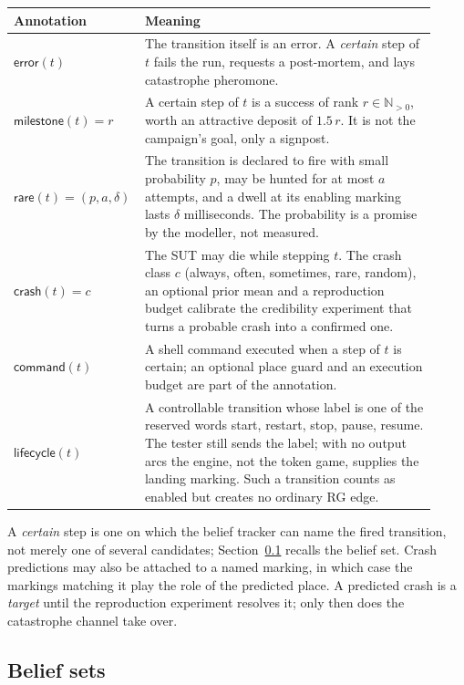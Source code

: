 \documentclass[11pt,a4paper]{article}
\newcommand{\Npos}{\mathbb{N}_{>0}}
\begin{document}
\begin{center}
\small
\begin{tabular}{@{}p{0.24\linewidth}p{0.68\linewidth}@{}}
\toprule
Annotation & Meaning \\
\midrule
$\mathsf{error}(t)$ &
The transition itself is an error.  A \emph{certain} step of $t$ fails the
run, requests a post-mortem, and lays catastrophe pheromone. \\
$\mathsf{milestone}(t)=r$ &
A certain step of $t$ is a success of rank $r\in\Npos$, worth an attractive
deposit of $1.5\,r$.  It is not the campaign's goal, only a signpost. \\
$\mathsf{rare}(t)=(p,a,\delta)$ &
The transition is declared to fire with small probability $p$, may be hunted
for at most $a$ attempts, and a dwell at its enabling marking lasts $\delta$
milliseconds.  The probability is a promise by the modeller, not measured. \\
$\mathsf{crash}(t)=c$ &
The SUT may die while stepping $t$.  The crash class $c$ (always, often,
sometimes, rare, random), an optional prior mean and a reproduction budget
calibrate the credibility experiment that turns a probable crash into a
confirmed one. \\
$\mathsf{command}(t)$ &
A shell command executed when a step of $t$ is certain; an optional place
guard and an execution budget are part of the annotation. \\
$\mathsf{lifecycle}(t)$ &
A controllable transition whose label is one of the reserved words
\textsf{start}, \textsf{restart}, \textsf{stop}, \textsf{pause},
\textsf{resume}.  The tester still sends the label; with no output arcs the
engine, not the token game, supplies the landing marking.  Such a transition
counts as enabled but creates no ordinary RG edge. \\
\bottomrule
\end{tabular}
\end{center}

\noindent
A \emph{certain} step is one on which the belief tracker can name the fired
transition, not merely one of several candidates; Section~\ref{sec:belief}
recalls the belief set.  Crash predictions may also be attached to a named
marking, in which case the markings matching it play the role of the
predicted place.  A predicted crash is a \emph{target} until the reproduction
experiment resolves it; only then does the catastrophe channel take over.

\subsection{Belief sets}\label{sec:belief}
\end{document}
